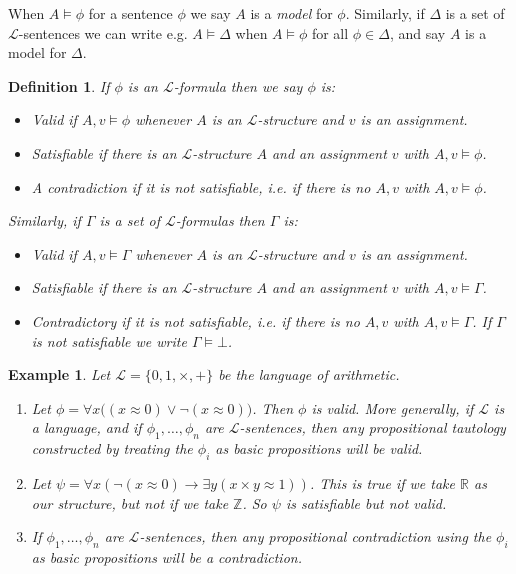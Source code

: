 \documentclass{article}
\theoremstyle{plain}
\newtheorem{definition}[theorem]{Definition}{\bfseries}{\upshape}
\newtheorem{example}[theorem]{Example}{\bfseries}{\upshape}
\newcommand{\bZ}{\mathbb{Z}}
\newcommand{\bR}{\mathbb{R}}
\newcommand{\sL}{\mathscr{L}}
\begin{document}
When $A\models \phi$ for a sentence $\phi$ we say $A$ is a \emph{model} for $\phi$. Similarly, if $\Delta$ is a set of $\sL$-sentences we can write e.g. $A\models \Delta$ when $A\models \phi$ for all $\phi\in\Delta$, and say $A$ is a model for $\Delta$.

\begin{definition}
If $\phi$ is an $\sL$-formula then we say $\phi$ is:
\begin{itemize}
\item \emph{Valid} if $A,v\models \phi$ whenever $A$ is an $\sL$-structure and $v$ is an assignment.
\item \emph{Satisfiable} if there is an $\sL$-structure $A$ and an assignment $v$ with $A,v\models \phi$.
\item A \emph{contradiction} if it is not satisfiable, i.e. if there is no $A,v$ with $A,v\models\phi$.
\end{itemize}

Similarly, if $\Gamma$ is a set of $\sL$-formulas then $\Gamma$ is:
\begin{itemize}
\item \emph{Valid} if $A,v\models \Gamma$ whenever $A$ is an $\sL$-structure and $v$ is an assignment.
\item \emph{Satisfiable} if there is an $\sL$-structure $A$ and an assignment $v$ with $A,v\models \Gamma$.
\item \emph{Contradictory} if it is not satisfiable, i.e. if there is no $A,v$ with $A,v\models\Gamma$. If $\Gamma$ is not satisfiable we write $\Gamma\models \bot$.
\end{itemize}
\end{definition}

\begin{example}
Let $\sL=\{0,1,\times,+\}$ be the language of arithmetic.
\begin{enumerate}
\item Let $\phi = \forall x\big((x\approx 0)\vee \neg(x\approx 0)\big)$. Then $\phi$ is valid. More generally, if $\sL$ is a language, and if $\phi_1,\ldots,\phi_n$ are $\sL$-sentences, then any propositional tautology constructed by treating the $\phi_i$ as basic propositions will be valid.
\item Let $\psi= \forall x(\neg(x\approx 0)\rightarrow \exists y(x\times y\approx 1))$. This is true if we take $\bR$ as our structure, but not if we take $\bZ$. So $\psi$ is satisfiable but not valid.
\item If $\phi_1,\ldots,\phi_n$ are $\sL$-sentences, then any propositional contradiction using the $\phi_i$ as basic propositions will be a contradiction. 
\end{enumerate}
\end{example}
\end{document}
